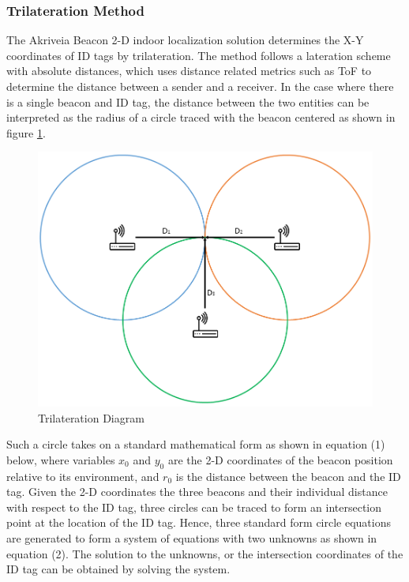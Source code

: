 \pagebreak
\subsubsection{Trilateration Method}
\medskip
The Akriveia Beacon 2-D indoor localization solution determines the X-Y coordinates of ID tags by trilateration. The method follows a lateration scheme with absolute distances, which uses distance related metrics such as ToF to determine the distance between a sender and a receiver. In the case where there is a single beacon and ID tag, the distance between the two entities can be interpreted as the radius of a circle traced with the beacon centered as shown in figure \ref{tri}. 

\medskip
\begin{figure}[H]
\centering
    \includegraphics[scale=0.55]{./images/Tri.png}
    \caption{Trilateration Diagram}
    \label{tri}
\end{figure}


\medskip
Such a circle takes on a standard mathematical form as shown in equation (1) below, where variables $x_0$ and $y_0$ are the 2-D coordinates of the beacon position relative to its environment, and $r_0$ is the distance between the beacon and the ID tag. Given the 2-D coordinates the three beacons and their individual distance with respect to the ID tag, three circles can be traced to form an intersection point at the location of the ID tag. Hence, three standard form circle equations are generated to form a system of equations with two unknowns as shown in equation (2). The solution to the unknowns, or the intersection coordinates of the ID tag can be obtained by solving the system.


